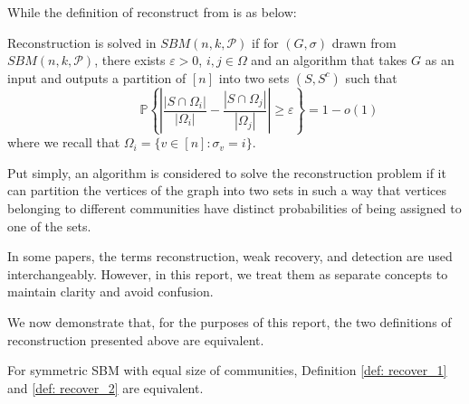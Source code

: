 While the definition of reconstruct from \cite{TheConjecture} is as below:
\begin{definition}[Reconstruction]\label{def: recover_2}
Reconstruction is solved in $SBM(n,k,\mathcal{P})$ if for $(G,\sigma)$ drawn from $SBM(n,k,\mathcal{P})$, there exists $\varepsilon > 0$, $i,j \in\Omega$ and an algorithm that takes $G$ as an input and outputs a partition of $[n]$ into two sets $(S,S^c)$ such that\begin{equation}\label{equn:1.4}
    ~~~~~~~~~~~~~~~~~\mathbb{P}\left\{ \left| \frac{|S \cap \Omega_i|}{|\Omega_i|} - \frac{|S \cap \Omega_j|}{|\Omega_j|} \right| \geq \varepsilon \right\} = 1 - o(1)
\end{equation}
where we recall that $\Omega_i = \{ v\in [n] : \sigma_v = i \}.$
\end{definition}
\begin{remark}
    Put simply, an algorithm is considered to solve the reconstruction problem if it can partition the vertices of the graph into two sets in such a way that vertices belonging to different communities have distinct probabilities of being assigned to one of the sets. 
\end{remark}
\begin{remark}
    In some papers, the terms reconstruction, weak recovery, and detection are used interchangeably. However, in this report, we treat them as separate concepts to maintain clarity and avoid confusion.
\end{remark}
We now demonstrate that, for the purposes of this report, the two definitions of reconstruction presented above are equivalent.
\begin{claim}\label{claim1}
    For symmetric SBM with equal size of communities, Definition \ref{def: recover_1} and \ref{def: recover_2} are equivalent.
\end{claim}
